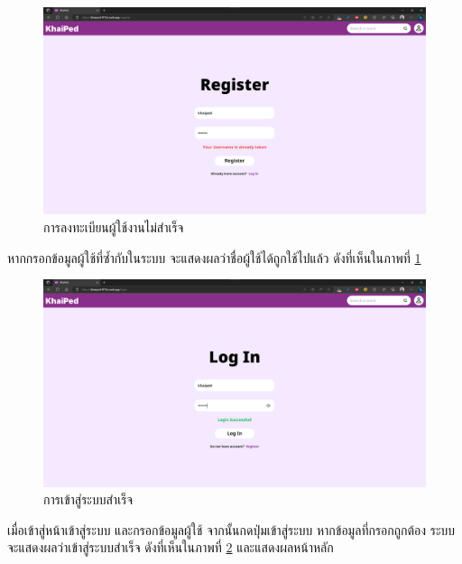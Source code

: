 \documentclass[12pt,oneside,openright,a4paper]{cpe-thai-project}
\begin{document}
\pagebreak
\begin{figure}[!h]\centering
	\includegraphics[width=\textwidth, keepaspectratio=true]{image/chap4/UI/login/register failed.png}
	\caption{{การลงทะเบียนผู้ใช้งานไม่สำเร็จ}}\label{fig:chap4UIRegisterFailed}
\end{figure}
\hspace{1cm}
หากกรอกข้อมูลผู้ใช้ที่ซ้ำกับในระบบ จะแสดงผลว่าชื่อผู้ใช้ได้ถูกใช้ไปแล้ว ดังที่เห็นในภาพที่ \ref{fig:chap4UIRegisterFailed}

\begin{figure}[!h]\centering
	\includegraphics[width=\textwidth, keepaspectratio=true]{image/chap4/UI/login/login success.png}
	\caption{{การเข้าสู่ระบบสำเร็จ}}\label{fig:chap4UILogInSuccess}
\end{figure}
\hspace{1cm}
เมื่อเข้าสู่หน้าเข้าสู่ระบบ และกรอกข้อมูลผู้ใช้ จากนั้นกดปุ่มเข้าสู่ระบบ หากข้อมูลที่กรอกถูกต้อง ระบบจะแสดงผลว่าเข้าสู่ระบบสำเร็จ
ดังที่เห็นในภาพที่ \ref{fig:chap4UILogInSuccess} และแสดงผลหน้าหลัก
\end{document}
